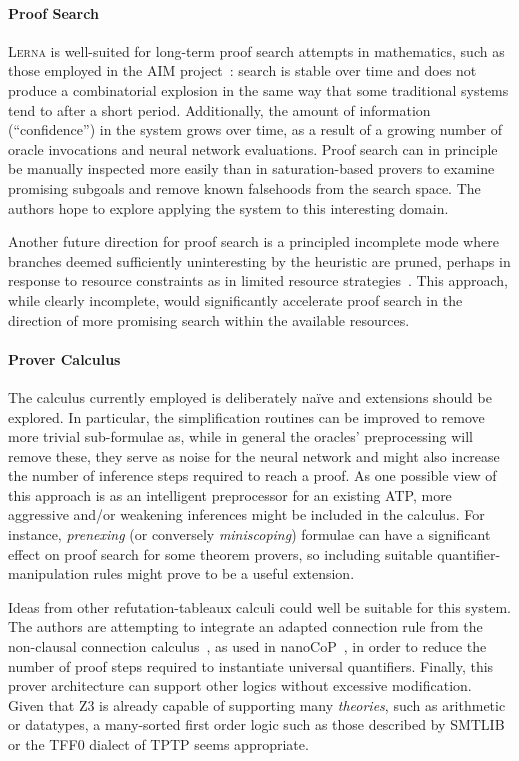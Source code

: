\documentclass{llncs}
\newcommand{\lerna}{\textsc{Lerna}}
\newcommand{\z}[1]{\textsc{Z3}}
\begin{document}
\paragraph{Proof Search}
\lerna{} is well-suited for long-term proof search attempts in mathematics, such as those employed in the AIM project~\cite{AIM}: search is stable over time and does not produce a combinatorial explosion in the same way that some traditional systems tend to after a short period.
Additionally, the amount of information (``confidence'') in the system grows over time, as a result of a growing number of oracle invocations and neural network evaluations.
Proof search can in principle be manually inspected more easily than in saturation-based provers to examine promising subgoals and remove known falsehoods from the search space.
The authors hope to explore applying the system to this interesting domain. 

Another future direction for proof search is a principled incomplete mode where branches deemed sufficiently uninteresting by the heuristic are pruned, perhaps in response to resource constraints as in limited resource strategies~\cite{LRS}.
This approach, while clearly incomplete, would significantly accelerate proof search in the direction of more promising search within the available resources.

\paragraph{Prover Calculus}
The calculus currently employed is deliberately na\"ive and extensions should be explored. 
In particular, the simplification routines can be improved to remove more trivial sub-formulae as, while in general the oracles' preprocessing will remove these, they serve as noise for the neural network and might also increase the number of inference steps required to reach a proof.
As one possible view of this approach is as an intelligent preprocessor for an existing ATP, more aggressive and/or weakening inferences might be included in the calculus.
For instance, \emph{prenexing} (or conversely \emph{miniscoping}) formulae can have a significant effect on proof search for some theorem provers, so including suitable quantifier-manipulation rules might prove to be a useful extension.

Ideas from other refutation-tableaux calculi could well be suitable for this system.
The authors are attempting to integrate an adapted connection rule from the non-clausal connection calculus~\cite{non-clausal-connections}, as used in nanoCoP~\cite{nanocop}, in order to reduce the number of proof steps required to instantiate universal quantifiers.
Finally, this prover architecture can support other logics without excessive modification.
Given that \z3 is already capable of supporting many \emph{theories}, such as arithmetic or datatypes, a many-sorted first order logic such as those described by SMTLIB or the TFF0 dialect of TPTP seems appropriate.
\end{document}
